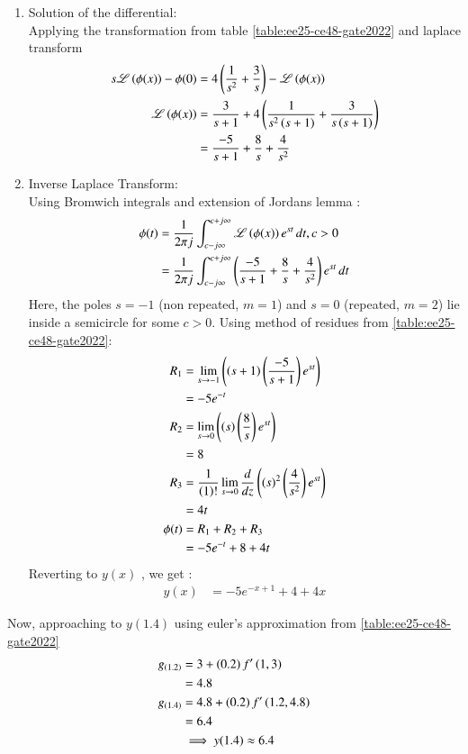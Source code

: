 \documentclass[journal,12pt,onecolumn]{IEEEtran}
\theoremstyle{remark}
\begin{document}
\begin{enumerate}
    \item Solution of the differential:\\
 Applying the transformation from table \ref{table:ee25-ce48-gate2022} and laplace transform 
    \begin{align}
             s\mathscr{L}\left(\phi(x)\right) - \phi(0) &= 4\left(\frac{1}{s^2}+\frac{3}{s}\right)-\mathscr{L}\left(\phi(x)\right)\\
             \mathscr{L}\left(\phi(x)\right) &= \frac{3}{s+1} + 4\left(\frac{1}{s^2\left(s+1\right)}+\frac{3}{s\left(s+1\right)}\right)\\
             &=\frac{-5}{s+1} + \frac{8}{s} + \frac{4}{s^2}
    \end{align}
\item  Inverse Laplace Transform:\\
Using Bromwich integrals and extension of Jordans lemma :
\begin{align}
    \phi(t) &= \frac{1}{2\pi j}\int_{c-j\infty}^{c+j\infty}\mathscr{L}\left(\phi(x)\right)e^{st}\,dt , c > 0\\
     &= \frac{1}{2\pi j}\int_{c-j\infty}^{c+j\infty}\left(\frac{-5}{s+1} + \frac{8}{s} + \frac{4}{s^2}\right)e^{st}\,dt
\end{align}
Here, the poles $s=-1$ (non repeated, $m=1$) and $s=0$ (repeated, $m=2$) lie inside a semicircle for some $c>0$. Using method of residues from \ref{table:ee25-ce48-gate2022}:
\begin{align}
    R_1 &= \lim\limits_{s\to -1}\left({\left(s+1\right)}\left(\frac{-5}{s+1}\right)e^{st}\right) \\
    &= -5e^{-t}\\
   R_2 &= \lim\limits_{s\to 0}\left({\left(s\right)}\left(\frac{8}{s}\right)e^{st}\right)\\
   &= 8\\
 R_3&=\frac{1}{\left(1\right)!}\lim\limits_{s\to 0}\frac{d}{dz}\left({(s)}^{2}\left(\frac{4}{s^2}\right)e^{st}\right)\\
 &=4t\\
\phi(t) &= R_1 + R_2 + R_3\\
&= -5e^{-t} + 8 + 4t
\end{align}
Reverting to $y(x)$ , we get :
\begin{align}
    y(x) &= -5e^{-x+1} + 4 + 4x
\end{align}
\end{enumerate}
Now, approaching to $y(1.4)$ using euler's approximation from \ref{table:ee25-ce48-gate2022}
\begin{align}
    g_{\left(1.2\right)} &= 3 + \left(0.2\right)f'\left(1,3\right)\\
    &=4.8\\
    g_{\left(1.4\right)} &= 4.8 +\left(0.2\right)f'\left(1.2,4.8\right)\\
    &= 6.4\\
    &\implies y(1.4) \approx 6.4 
\end{align}
\end{document}
